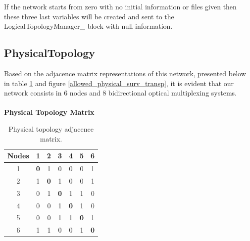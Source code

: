 If the network starts from zero with no initial information or files given then these three last variables will be created and sent to the LogicalTopologyManager\_  block with null information. 
\subsection{PhysicalTopology}
Based on the adjacence matrix representations of this network, presented below in table \ref{Adjacence_Matrix} and figure \ref{allowed_physical_surv_transp}, it is evident that our network consists in 6 nodes and 8 bidirectional optical multiplexing systems.\\ \\
\textbf{Physical Topology Matrix}
\begin{table}[H]
	\centering
	\begin{tabular}{|c|c|c|c|c|c|c|}
		\hline
		\textbf{Nodes} & 1 & 2 & 3 & 4 & 5 & 6 \\ \hline
		1     & \textbf{0} & 1 & 0 & 0 & 0 & 1 \\ \hline
		2     & 1 & \textbf{0} & 1 & 0 & 0 & 1 \\ \hline
		3     & 0 & 1 & \textbf{0} & 1 & 1 & 0 \\ \hline
		4     & 0 & 0 & 1 & \textbf{0} & 1 & 0 \\ \hline
		5     & 0 & 0 & 1 & 1 & \textbf{0} & 1 \\ \hline
		6     & 1 & 1 & 0 & 0 & 1 & \textbf{0} \\ \hline
	\end{tabular}
	\caption{Physical topology adjacence matrix.}
	\label{Adjacence_Matrix}
\end{table}

